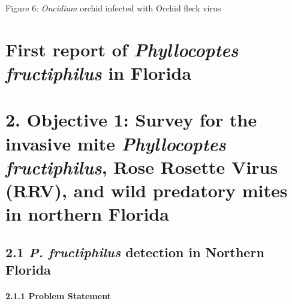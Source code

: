 \documentclass[12pt,final,CPage]{ufthesis}
\begin{document}
{  Figure 6: \emph{Oncidium} orchid infected with Orchid fleck virus

  \hypertarget{first-report-of-phyllocoptes-fructiphilus-in-florida}{%
  \chapter{\texorpdfstring{First report of \emph{Phyllocoptes fructiphilus} in Florida}{First report of Phyllocoptes fructiphilus in Florida}}\label{first-report-of-phyllocoptes-fructiphilus-in-florida}}

  

  \hypertarget{survey}{%
  \chapter{\texorpdfstring{2. Objective 1: Survey for the invasive mite \emph{Phyllocoptes fructiphilus}, Rose Rosette Virus (RRV), and wild predatory mites in northern Florida}{2. Objective 1: Survey for the invasive mite Phyllocoptes fructiphilus, Rose Rosette Virus (RRV), and wild predatory mites in northern Florida}}\label{survey}}

  \hypertarget{survey-nfl}{%
  \section{\texorpdfstring{2.1 \emph{P. fructiphilus} detection in Northern Florida}{2.1 P. fructiphilus detection in Northern Florida}}\label{survey-nfl}}

  \hypertarget{problem-statement}{%
  \subsubsection{2.1.1 Problem Statement}\label{problem-statement}}

}
\end{document}
